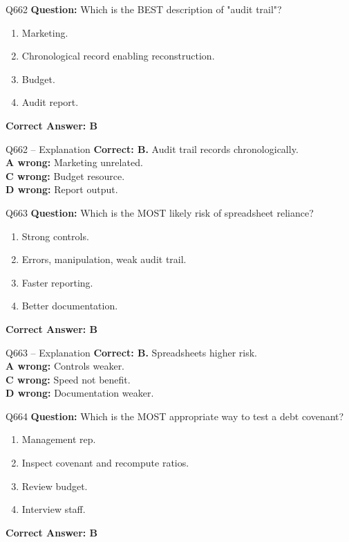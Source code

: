 \documentclass[aspectratio=169,10pt]{beamer}
\begin{document}
	\begin{frame}[t]{Q662}
		\small
		\textbf{Question:} Which is the BEST description of "audit trail"?
		\begin{enumerate}[label=\Alph*.,itemsep=1pt,topsep=2pt]
			\item Marketing.
			\item Chronological record enabling reconstruction.
			\item Budget.
			\item Audit report.
		\end{enumerate}
		\vspace{4pt}
		\textbf{Correct Answer: B}
	\end{frame}
	
	\begin{frame}[t]{Q662 -- Explanation}
		\small
		\textbf{Correct: B.} Audit trail records chronologically. \\[4pt]
		\textbf{A wrong:} Marketing unrelated. \\[2pt]
		\textbf{C wrong:} Budget resource. \\[2pt]
		\textbf{D wrong:} Report output.
	\end{frame}
	
	\begin{frame}[t]{Q663}
		\small
		\textbf{Question:} Which is the MOST likely risk of spreadsheet reliance?
		\begin{enumerate}[label=\Alph*.,itemsep=1pt,topsep=2pt]
			\item Strong controls.
			\item Errors, manipulation, weak audit trail.
			\item Faster reporting.
			\item Better documentation.
		\end{enumerate}
		\vspace{4pt}
		\textbf{Correct Answer: B}
	\end{frame}
	
	\begin{frame}[t]{Q663 -- Explanation}
		\small
		\textbf{Correct: B.} Spreadsheets higher risk. \\[4pt]
		\textbf{A wrong:} Controls weaker. \\[2pt]
		\textbf{C wrong:} Speed not benefit. \\[2pt]
		\textbf{D wrong:} Documentation weaker.
	\end{frame}
	
	\begin{frame}[t]{Q664}
		\small
		\textbf{Question:} Which is the MOST appropriate way to test a debt covenant?
		\begin{enumerate}[label=\Alph*.,itemsep=1pt,topsep=2pt]
			\item Management rep.
			\item Inspect covenant and recompute ratios.
			\item Review budget.
			\item Interview staff.
		\end{enumerate}
		\vspace{4pt}
		\textbf{Correct Answer: B}
	\end{frame}
	
\end{document}
